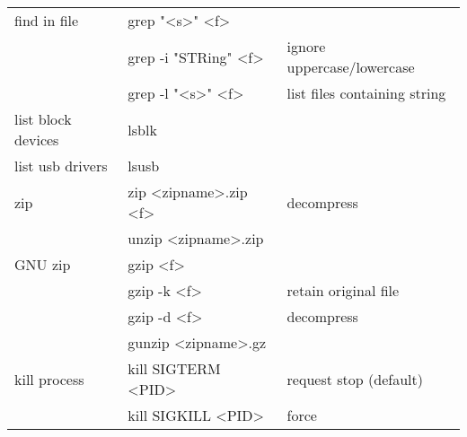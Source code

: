 {\begin{tabularx}{\linewidth}{@{} l>{\ttfamily}lX @{}}
    find in file       & grep "<s>" <f>        &                              \\
                       & grep -i "STRing" <f>  & ignore uppercase/lowercase   \\
                       & grep -l "<s>" <f>     & list files containing string \\
    list block devices & lsblk                 &                              \\
    list usb drivers   & lsusb                 &                              \\
    zip                & zip <zipname>.zip <f> & decompress                   \\
                       & unzip <zipname>.zip   &                              \\
    GNU zip            & gzip <f>              &                              \\
                       & gzip -k <f>           & retain original file         \\
                       & gzip -d <f>           & decompress                   \\
                       & gunzip <zipname>.gz   &                              \\
    kill process       & kill SIGTERM <PID>    & request stop (default)       \\
                       & kill SIGKILL <PID>    & force                        \\
    \bottomrule
\end{tabularx}

} %




